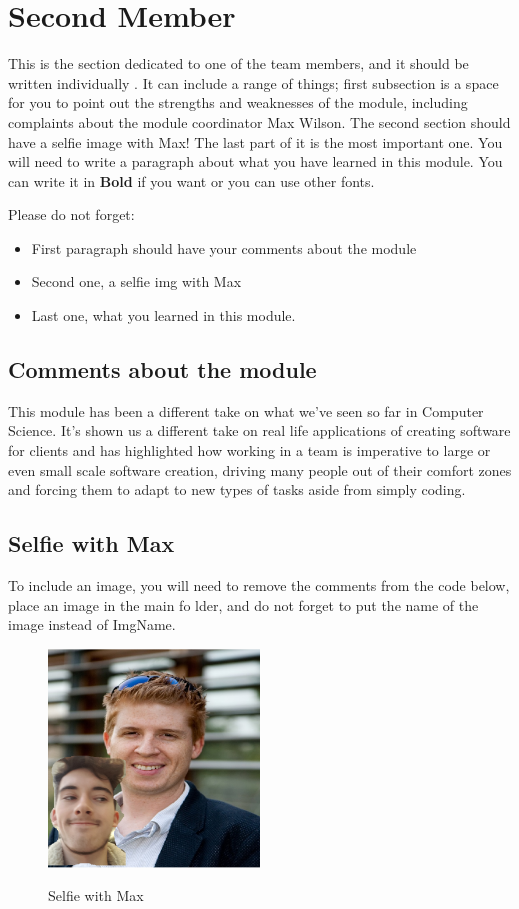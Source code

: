 \section{Second Member}
This is the section dedicated to one of the team members, and it should be written individually . It can include a range of things; first subsection is a space for you to point out the strengths and weaknesses of the module, including complaints about the module coordinator Max Wilson. The second section should have a selfie image with Max! The last part of it is the most important one. You will need to write a paragraph about what you have learned in this module. You can write it in \textbf{Bold} if you want or you can use other fonts. 

Please do not forget:
\begin{itemize}
	\item First paragraph should have your comments about the module
	\item Second one, a selfie img with Max
	\item Last one, what you learned in this module.
\end{itemize}

\subsection{Comments about the module}
This module has been a different take on what we've seen so far in Computer Science. It's shown us a different take on real life applications of creating software for clients and has highlighted how working in a team is imperative to large or even small scale software creation, driving many people out of their comfort zones and forcing them to adapt to new types of tasks aside from simply coding.

\subsection{Selfie with Max}

To include an image, you will need to remove the comments from the code below, place an image in the main fo lder, and do not forget to put the name of the image instead of ImgName. 

\begin{figure}[h]
	\caption{Selfie with Max}
	\centering
	\includegraphics[width=0.5\textwidth]{maxnme}
	\label{fig:selfie}
\end{figure}

